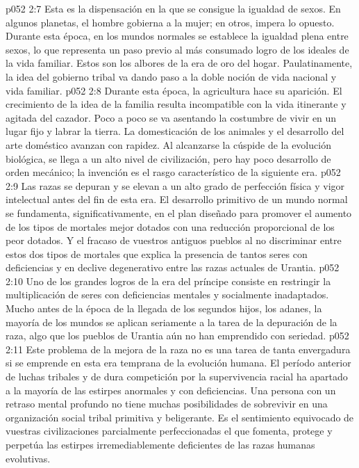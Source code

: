 \vs p052 2:7 Esta es la dispensación en la que se consigue la igualdad de sexos. En algunos planetas, el hombre gobierna a la mujer; en otros, impera lo opuesto. Durante esta época, en los mundos normales se establece la igualdad plena entre sexos, lo que representa un paso previo al más consumado logro de los ideales de la vida familiar. Estos son los albores de la era de oro del hogar. Paulatinamente, la idea del gobierno tribal va dando paso a la doble noción de vida nacional y vida familiar.
\vs p052 2:8 Durante esta época, la agricultura hace su aparición. El crecimiento de la idea de la familia resulta incompatible con la vida itinerante y agitada del cazador. Poco a poco se va asentando la costumbre de vivir en un lugar fijo y labrar la tierra. La domesticación de los animales y el desarrollo del arte doméstico avanzan con rapidez. Al alcanzarse la cúspide de la evolución biológica, se llega a un alto nivel de civilización, pero hay poco desarrollo de orden mecánico; la invención es el rasgo característico de la siguiente era.
\vs p052 2:9 \pc Las razas se depuran y se elevan a un alto grado de perfección física y vigor intelectual antes del fin de esta era. El desarrollo primitivo de un mundo normal se fundamenta, significativamente, en el plan diseñado para promover el aumento de los tipos de mortales mejor dotados con una reducción proporcional de los peor dotados. Y el fracaso de vuestros antiguos pueblos al no discriminar entre estos dos tipos de mortales que explica la presencia de tantos seres con deficiencias y en declive degenerativo entre las razas actuales de Urantia.
\vs p052 2:10 Uno de los grandes logros de la era del príncipe consiste en restringir la multiplicación de seres con deficiencias mentales y socialmente inadaptados. Mucho antes de la época de la llegada de los segundos hijos, los adanes, la mayoría de los mundos se aplican seriamente a la tarea de la depuración de la raza, algo que los pueblos de Urantia aún no han emprendido con seriedad.
\vs p052 2:11 Este problema de la mejora de la raza no es una tarea de tanta envergadura si se emprende en esta era temprana de la evolución humana. El período anterior de luchas tribales y de dura competición por la supervivencia racial ha apartado a la mayoría de las estirpes anormales y con deficiencias. Una persona con un retraso mental profundo no tiene muchas posibilidades de sobrevivir en una organización social tribal primitiva y beligerante. Es el sentimiento equivocado de vuestras civilizaciones parcialmente perfeccionadas el que fomenta, protege y perpetúa las estirpes irremediablemente deficientes de las razas humanas evolutivas.
